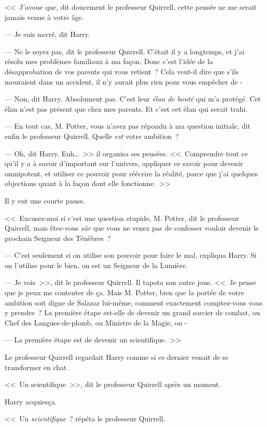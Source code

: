 <<~J'avoue que, dit doucement le professeur Quirrell, cette pensée ne me serait jamais venue à votre âge.

--- Je suis navré, dit Harry.

--- Ne le soyez pas, dit le professeur Quirrell. C'était il y a longtemps, et j'ai résolu mes problèmes familiaux à ma façon. Donc c'est l'idée de la désapprobation de vos parents qui vous retient~? Cela veut-il dire que s'ils mouraient dans un accident, il n'y aurait plus rien pour vous empêcher de -

--- Non, dit Harry. Absolument pas. C'est leur \emph{élan de bonté} qui m'a protégé. Cet élan n'est pas présent que chez mes parents. Et c'est cet élan qui serait trahi.

--- En tout cas, M. Potter, vous n'avez pas répondu à ma question initiale, dit enfin le professeur Quirrell. Quelle \emph{est} votre ambition~?

--- Oh, dit Harry. Euh…~>> il organisa ses pensées. <<~Comprendre tout ce qu'il y a à savoir d'important sur l'univers, appliquer ce savoir pour devenir omnipotent, et utiliser ce pouvoir pour réécrire la réalité, parce que j'ai quelques objections quant à la façon dont elle fonctionne.~>>

Il y eut une courte pause.

<<~Excusez-moi si c'est une question stupide, M. Potter, dit le professeur Quirrell, mais êtes-vous \emph{sûr} que vous ne venez pas de confesser vouloir devenir le prochain Seigneur des Ténèbres~?

--- C'est seulement si on utilise son pouvoir pour faire le mal, expliqua Harry. Si on l'utilise pour le bien, on est un Seigneur de la Lumière.

--- Je vois~>>, dit le professeur Quirrell. Il tapota son autre joue. <<~Je pense que je peux me contenter de ça. Mais M. Potter, bien que la portée de votre ambition soit digne de Salazar lui-même, comment exactement comptez-vous vous y prendre~? La première étape est-elle de devenir un grand sorcier de combat, ou Chef des Langues-de-plomb, ou Ministre de la Magie, ou -

--- La première étape est de devenir un scientifique.~>>

Le professeur Quirrell regardait Harry comme si ce dernier venait de se transformer en chat.

<<~Un scientifique~>>, dit le professeur Quirrell après un moment.

Harry acquiesça.

<<~Un \emph{scientifique}~? répéta le professeur Quirrell.

